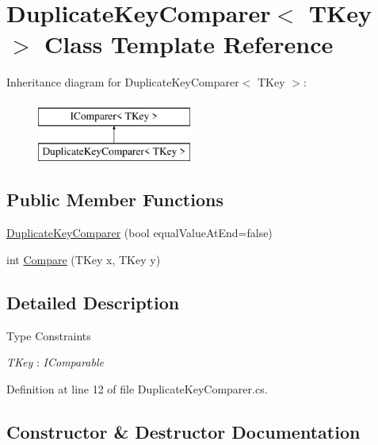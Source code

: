 \hypertarget{class_duplicate_key_comparer}{}\section{Duplicate\+Key\+Comparer$<$ T\+Key $>$ Class Template Reference}
\label{class_duplicate_key_comparer}
Inheritance diagram for Duplicate\+Key\+Comparer$<$ T\+Key $>$\+:\begin{figure}[H]
\begin{center}
\leavevmode
\includegraphics[height=2.000000cm]{class_duplicate_key_comparer}
\end{center}
\end{figure}
\subsection*{Public Member Functions}
\begin{DoxyCompactItemize}
\item 
\hyperlink{class_duplicate_key_comparer_ac0fd26f90b29d15546cb77a7c7cad1bf}{Duplicate\+Key\+Comparer} (bool equal\+Value\+At\+End=false)
\item 
int \hyperlink{class_duplicate_key_comparer_aa6fc7a9d6aa3e66016a7cc4cd5d3b04b}{Compare} (T\+Key x, T\+Key y)
\end{DoxyCompactItemize}


\subsection{Detailed Description}
\begin{Desc}
\item[Type Constraints]\begin{description}
\item[{\em T\+Key} : {\em I\+Comparable}]\end{description}
\end{Desc}


Definition at line 12 of file Duplicate\+Key\+Comparer.\+cs.



\subsection{Constructor \& Destructor Documentation}
\mbox{\label{class_duplicate_key_comparer_ac0fd26f90b29d15546cb77a7c7cad1bf}} 
